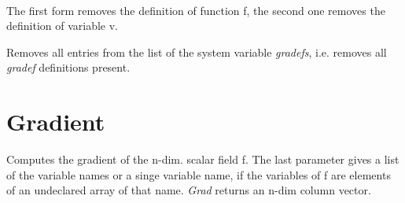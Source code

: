 \documentclass[../Maxima_Workbook.tex]{subfiles}
\begin{document}
\lz {} \\
 \hfill \tcr{[function]}

\lz The first form removes the definition of function f, the second one removes the definition of variable v.

\lzz {} \hfill \tcr{[function]}

\lz Removes all entries from the list of the system variable \emph{gradefs}, i.e. removes all \emph{gradef} definitions present.

\section{Gradient}

\lz {} \hfill {}

\lz Computes the gradient of the n-dim. scalar field f. The last parameter gives a list of the variable names or a singe variable name, if the variables of f are elements of an undeclared array of that name. \emph{Grad} returns an n-dim column vector.
\end{document}
